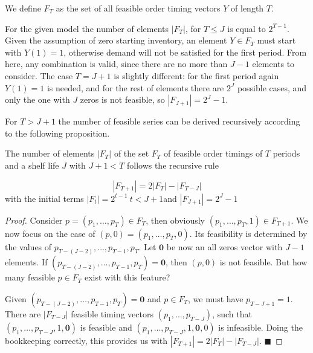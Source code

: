 \begin{defn}
We define $F_T$ as the set of all feasible order timing vectors $Y$ of length $T$.
\end{defn}

For the given model the number of elements $|F_T|$, for $T\leq J$ is equal to $2^{T-1}$. Given the assumption of zero starting inventory, an element $Y\in F_T$ must start with $Y(1)=1$, otherwise demand will not be satisfied for the first period. From here, any combination is valid, since there are no more than $J-1$ elements to consider. The case $T=J+1$ is slightly different: for the first period again $Y(1)=1$ is needed, and for the rest of elements there are $2^J$ possible cases, and only the one with $J$ zeros is not feasible, so $|F_{J+1}|=2^J-1$.

For $T>J+1$ the number of feasible series can be derived recursively according to the following proposition.
\begin{proposition}
\label{prop:numberfeasible}
The number of elements $|F_T|$ of the set $F_T$ of feasible order timings of $T$ periods and a shelf life $J$ with $J+1<T$ follows the recursive rule

\begin{equation}
\label{eq:numberfeasibleY(T)}
|F_{T+1}|= 2|F_{T}| -|F_{T-J}|
\end{equation}
with the initial terms  $|F_{t}|=2^{t-1} \  t<J+1$and  $|F_{J+1}|=2^J-1 $
\end{proposition}

\begin{proof}

Consider $p=(p_1,\ldots,p_{T})\in F_{T}$, then obviously $(p_1,\ldots,p_{T},1)\in F_{T+1}$. We now focus on the case of $(p,0)=(p_1,\ldots,p_{T},0)$. Its feasibility is determined by the values of $p_{T-(J-2)},\ldots, p_{T-1},p_T$. Let $\boldsymbol{0}$ be now an all zeros vector with $J-1$ elements. If $(p_{T-(J-2)},\ldots, p_{T-1},p_T)=\boldsymbol{0}$, then $(p,0)$ is not feasible. But how many feasible $p\in F_{T}$ exist with this feature?

Given $(p_{T-(J-2)},\ldots, p_{T-1},p_T)=\boldsymbol{0}$ and $p\in F_{T}$, we must have $p_{T-J+1}=1$. There are $|F_{T-J}|$ feasible timing vectors $(p_1,\ldots,p_{T-J})$, such that $(p_1,\ldots,p_{T-J},1,\boldsymbol{0})$ is feasible and  $(p_1,\ldots,p_{T-J},1,\boldsymbol{0},0)$ is infeasible.
Doing the bookkeeping correctly, this provides us with $|F_{T+1}|= 2|F_{T}| -|F_{T-J}|$.
$\blacksquare$
\end{proof}




